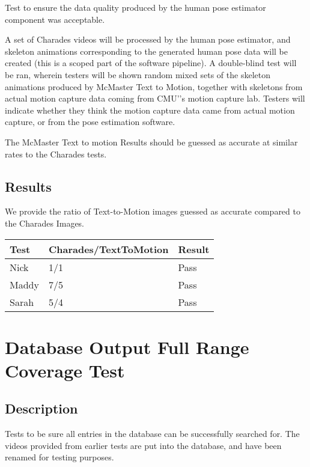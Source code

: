 \documentclass{scrreprt}
\begin{document}
Test to ensure the data quality produced by the human pose estimator component
was acceptable.

A set of Charades videos will be processed by the human pose estimator, and
skeleton animations corresponding to the generated human pose data will be
created (this is a scoped part of the software pipeline). A double-blind test
will be ran, wherein testers will be shown random mixed sets of the skeleton
animations produced by McMaster Text to Motion, together with skeletons from
actual motion capture data coming from CMU'’s motion capture lab. Testers will
indicate whether they think the motion capture data came from actual motion
capture, or from the pose estimation software.

The McMaster Text to motion Results should be guessed as accurate at similar
rates to the Charades tests.

\subsection{Results}

We provide the ratio of Text-to-Motion images guessed as accurate compared to
the Charades Images.

\begin{table}[H]
        \centering
        \begin{tabular}{||p{2.5cm}|p{5.0cm}|p{2.5cm}||}
                \hline
                \textbf Test & \textbf Charades/TextToMotion & \textbf Result\\
                \hline\hline
                Nick &  1/1 & Pass\\
                \hline
                Maddy &  7/5  & Pass\\
                \hline
                Sarah & 5/4 & Pass\\
                \hline
        \end{tabular}
\end{table}

\section{Database Output Full Range Coverage Test}
\subsection{Description}

Tests to be sure all entries in the database can be successfully searched for.
The videos provided from earlier tests are put into the database, and have been
renamed for testing purposes.
\end{document}
